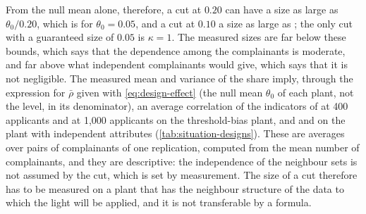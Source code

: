 From the null mean alone, therefore, a cut at $0.20$ can have a size as large as $\theta_0/0.20$, which is \SiMarkovTwenty{} for $\theta_0=0.05$, and a cut at $0.10$ a size as large as \SiMarkovTen{}; the only cut with a guaranteed size of $0.05$ is $\kappa=1$. The measured sizes are far below these bounds, which says that the dependence among the complainants is moderate, and far above what independent complainants would give, which says that it is not negligible. The measured mean and variance of the share imply, through the expression for $\bar\rho$ given with \cref{eq:design-effect} (the null mean $\theta_0$ of each plant, not the level, in its denominator), an average correlation of the indicators of \SiRhoSmall{} at 400 applicants and \SiRhoLarge{} at 1,000 applicants on the threshold-bias plant, and \SiInRhoSmall{} and \SiInRhoLarge{} on the plant with independent attributes (\cref{tab:situation-designs}). These are averages over pairs of complainants of one replication, computed from the mean number of complainants, and they are descriptive: the independence of the neighbour sets is not assumed by the cut, which is set by measurement. The size of a cut therefore has to be measured on a plant that has the neighbour structure of the data to which the light will be applied, and it is not transferable by a formula.
